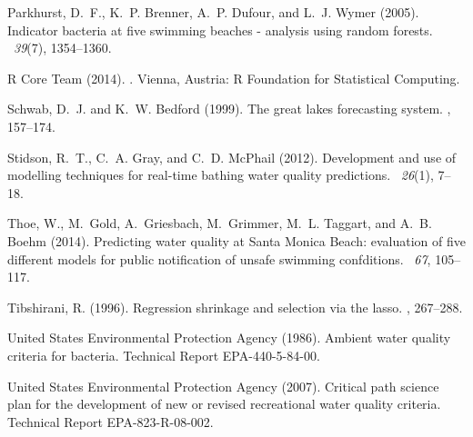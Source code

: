 \documentclass[authoryear,review, 12pt]{elsarticle}
\begin{document}
\begin{thebibliography}{}
Parkhurst, D.~F., K.~P. Brenner, A.~P. Dufour, and L.~J. Wymer (2005).
\newblock Indicator bacteria at five swimming beaches - analysis using random
  forests.
~{\em 39\/}(7), 1354--1360.

{R Core Team} (2014).
.
\newblock Vienna, Austria: R Foundation for Statistical Computing.

Schwab, D.~J. and K.~W. Bedford (1999).
\newblock The great lakes forecasting system.
, 157--174.

Stidson, R.~T., C.~A. Gray, and C.~D. McPhail (2012).
\newblock Development and use of modelling techniques for real-time bathing
  water quality predictions.
~{\em 26\/}(1), 7--18.

Thoe, W., M.~Gold, A.~Griesbach, M.~Grimmer, M.~L. Taggart, and A.~B. Boehm
  (2014).
\newblock Predicting water quality at {S}anta {M}onica {B}each: evaluation of
  five different models for public notification of unsafe swimming confditions.
~{\em 67}, 105--117.

Tibshirani, R. (1996).
\newblock Regression shrinkage and selection via the lasso.
, 267--288.

{United States Environmental Protection Agency} (1986).
\newblock Ambient water quality criteria for bacteria.
\newblock Technical Report EPA-440-5-84-00.

{United States Environmental Protection Agency} (2007).
\newblock Critical path science plan for the development of new or revised
  recreational water quality criteria.
\newblock Technical Report EPA-823-R-08-002.


\end{thebibliography}
\end{document}
